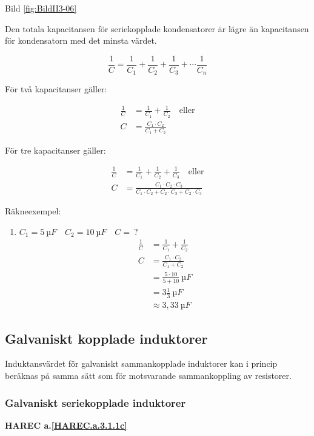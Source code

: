 Bild \ref{fig:BildII3-06}

Den totala kapacitansen för seriekopplade kondensatorer är lägre än kapacitansen
för kondensatorn med det minsta värdet.

\[
\frac{1}{C} = \frac{1}{C_1} + \frac{1}{C_2} +
\frac{1}{C_3} + \cdots \frac{1}{C_n}
\]

För två kapacitanser gäller:

\begin{align*}
  \frac{1}{C} &= \frac{1}{C_1} + \frac{1}{C_2} \quad \text{eller} \\
  C &= \frac{C_1 \cdot C_2}{C_1 + C_2}
\end{align*}

För tre kapacitanser gäller:

\begin{align*}
  \frac{1}{C} &= \frac{1}{C_1} + \frac{1}{C_2} + \frac{1}{C_3}
  \quad \text{eller} \\
  C &= \frac{C_1 \cdot C_2 \cdot C_3}
  {C_1 \cdot C_2 + C_2 \cdot C_3 + C_2 \cdot C_3}
\end{align*}

Räkneexempel:

\begin{enumerate}
  \item \(C_1 = 5\ µF \quad C_2 = 10\ µF \quad C =\ ?\)
    \begin{align*}
      \frac{1}{C} &= \frac{1}{C_1} + \frac{1}{C_2} \\
      C &= \frac{C_1 \cdot C_2}{C_1 + C_2} \\
      &= \frac{5 \cdot 10}{5 + 10}\ µF \\
      &= 3\frac{1}{3}\ µF \\
      &\approx 3,33\ µF
    \end{align*}
\end{enumerate}

\subsection{Galvaniskt kopplade induktorer}

Induktansvärdet för galvaniskt sammankopplade induktorer kan i princip
beräknas på samma sätt som för motsvarande sammankoppling av resistorer.

\subsubsection{Galvaniskt seriekopplade induktorer}
\textbf{HAREC a.\ref{HAREC.a.3.1.1c}\label{myHAREC.a.3.1.1c}}

